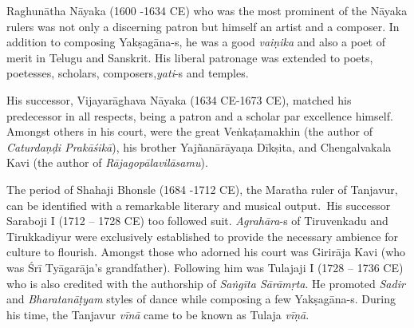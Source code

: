 
Raghunātha Nāyaka (1600 -1634 CE) who was the most prominent of the Nāyaka rulers was not only a discerning patron but himself an artist and a composer. In addition to composing Yakṣagāna-s, he was a good \textit{vaiṇika} and also a poet of merit in Telugu and Sanskrit. His liberal patronage was extended to poets, poetesses, scholars, composers,\break \textit{yati}-s and temples.


His successor, Vijayarāghava Nāyaka (1634 CE-1673 CE), matched his predecessor in all respects, being a patron and a scholar par excellence himself. Amongst others in his court, were the great Veṅkaṭamakhin (the author of \textit{Caturdaṇḍi Prakāśikā}), his brother Yajñanārāyaṇa Dīkṣita, and Chengalvakala Kavi (the author of \textit{Rājagopālavilāsamu}).


The period of Shahaji Bhonsle (1684 -1712 CE), the Maratha ruler of Tanjavur, can be identified with a remarkable literary and musical output.~His successor Saraboji I (1712 – 1728 CE) too followed suit. \textit{Agrahāra}-s of Tiruvenkadu and Tirukkadiyur were exclusively established to provide the necessary ambience for culture to flourish. Amongst those who adorned his court was Girirāja Kavi (who was Śrī Tyāgarāja’s grandfather). Following him was Tulajaji I (1728 – 1736 CE) who is also credited with the authorship of \textit{Saṅgīta Sārāmṛta}. He promoted \textit{Sadir} and \textit{Bharatanāṭyam} styles of dance while composing a few Yakṣagāna-s. During his time, the Tanjavur \textit{vīnā} came to be known as Tulaja \textit{vīṇā}.


